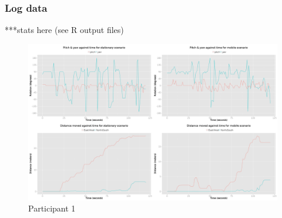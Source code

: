 \subsubsection{Log data}



	

		

***stats here (see R output files)


	\begin{figure}[h]
		\begin{center}
			\includegraphics[width=\linewidth]{images/24072014_1200_4up.png}
			\caption{Participant 1}
			\label{participant_1_4up}
		\end{center}
	\end{figure}

